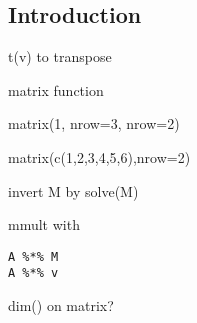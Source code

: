 
\subsection{Introduction}

t(v) to transpose

matrix function

matrix(1, nrow=3, nrow=2)

matrix(c(1,2,3,4,5,6),nrow=2)

invert M by solve(M)

mmult with
\begin{verbatim}
A %*% M
A %*% v
\end{verbatim}

dim() on matrix?

